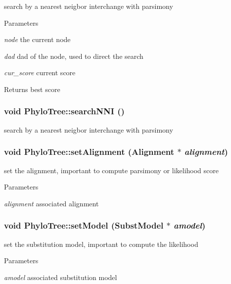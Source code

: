 \label{classPhyloTree_a87ed271cb0d09ad3069a20d996c343f9}
search by a nearest neigbor interchange with parsimony 
\begin{DoxyParams}{Parameters}
\item[{\em node}]the current node \item[{\em dad}]dad of the node, used to direct the search \item[{\em cur\_\-score}]current score \end{DoxyParams}
\begin{DoxyReturn}{Returns}
best score 
\end{DoxyReturn}
\hypertarget{classPhyloTree_a9537038984ab81f946a6025d5607637e}{
\subsubsection[{searchNNI}]{\setlength{\rightskip}{0pt plus 5cm}void PhyloTree::searchNNI ()}}
\label{classPhyloTree_a9537038984ab81f946a6025d5607637e}
search by a nearest neigbor interchange with parsimony \hypertarget{classPhyloTree_a6ea47346f05772215efc900309120428}{
\subsubsection[{setAlignment}]{\setlength{\rightskip}{0pt plus 5cm}void PhyloTree::setAlignment ({\bf Alignment} $\ast$ {\em alignment})}}
\label{classPhyloTree_a6ea47346f05772215efc900309120428}
set the alignment, important to compute parsimony or likelihood score 
\begin{DoxyParams}{Parameters}
\item[{\em alignment}]associated alignment \end{DoxyParams}
\hypertarget{classPhyloTree_a0e90911542265b82a3ed52da08bf9187}{
\subsubsection[{setModel}]{\setlength{\rightskip}{0pt plus 5cm}void PhyloTree::setModel ({\bf SubstModel} $\ast$ {\em amodel})}}
\label{classPhyloTree_a0e90911542265b82a3ed52da08bf9187}
set the substitution model, important to compute the likelihood 
\begin{DoxyParams}{Parameters}
\item[{\em amodel}]associated substitution model \end{DoxyParams}

